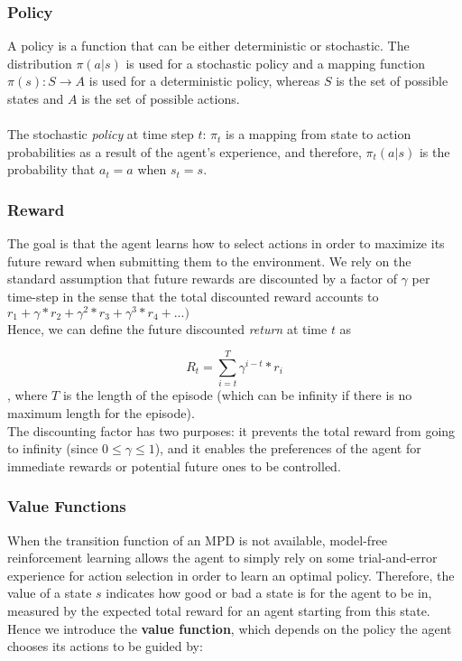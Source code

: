 \subsubsection{Policy}

A policy is a function that can be either deterministic or stochastic. 
The distribution $\pi(a|s)$ is used for a stochastic policy and a mapping function $\pi(s) : S \rightarrow A$ is used for a deterministic policy, whereas $S$ is the set of possible states and $A$ is the set of possible actions.
\\
\\
The stochastic \textit{policy} at time step $t$: $\pi_t$ is a mapping from state to action probabilities as a result of the agent's experience, and therefore, $\pi_t(a|s)$ is the probability that $a_t=a$ when $s_t=s$.

\subsubsection{Reward}

The goal is that the agent learns how to select actions in order to maximize its future reward when submitting them to the environment.
We rely on the standard assumption that future rewards are discounted by a factor of $\gamma$ per time-step in the sense that the total discounted reward accounts to $r_1 + \gamma*r_2 + \gamma^2*r_3 + \gamma^3*r_4 + ...)$
\\
Hence, we can define the future discounted \textit{return} at time $t$ as 

\begin{equation}\label{eq:discounted-return}
R_t=\sum_{i=t}^{T}{\gamma^{i-t}{*}r_{i}}
\end{equation}
, where $T$ is the length of the episode (which can be infinity if there is no maximum length for the episode).
\\
The discounting factor has two purposes: it prevents the total reward from going to infinity (since $0 \leq \gamma \leq 1$), and it enables the preferences of the agent for immediate rewards or potential future ones to be controlled. \cite{rl-demysitifed2}

\subsubsection{Value Functions}

When the transition function of an MPD is not available, model-free reinforcement learning allows the agent to simply rely on some trial-and-error experience for action selection in order to learn an optimal policy.
Therefore, the value of a state $s$ indicates how good or bad a state is for the agent to be in, measured by the expected total reward for an agent starting from this state. Hence we introduce the \textbf{value function}, which depends on the policy the agent chooses its actions to be guided by:

